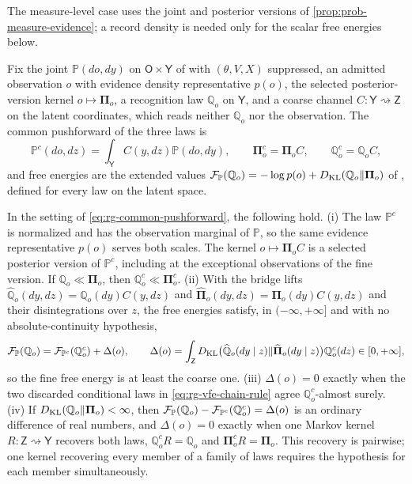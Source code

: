 The measure-level case uses the joint and posterior versions of
\cref{prop:prob-measure-evidence}; a record density is needed only for the
scalar free energies below.

Fix the joint $\mathbb P(do,dy)$ on $\mathsf O\times\mathsf Y$ of  with
$(\theta,V,X)$ suppressed, an admitted observation $o$ with evidence density representative $p(o)$,
the selected posterior-version kernel $o\mapsto\boldsymbol\Pi_o$, a recognition law $\mathbb Q_o$ on
$\mathsf Y$, and a coarse channel $C:\mathsf Y\rightsquigarrow\mathsf Z$ on the latent coordinates,
which reads neither $\mathbb Q_o$ nor the observation. The common pushforward of the three laws is
\begin{equation}
\mathbb P^c(do,dz)=\int_{\mathsf Y}C(y,dz)\mathbb P(do,dy),
\qquad
\boldsymbol\Pi^c_o=\boldsymbol\Pi_oC,
\qquad
\mathbb Q^c_o=\mathbb Q_oC,
\label{eq:rg-common-pushforward}
\end{equation}
and free energies are the extended values $\mathcal F_{\mathbb P}(\mathbb Q_o)=-\log p(o)
+D_{\mathrm{KL}}(\mathbb Q_o\Vert\boldsymbol\Pi_o)$ of , defined for every law on the
latent space.

\label{eq:rg-bridge-lifts}
In the setting of \eqref{eq:rg-common-pushforward}, the following hold. (i) The law $\mathbb P^c$
is normalized and has the observation marginal of $\mathbb P$, so the same evidence representative
$p(o)$ serves both scales. The kernel $o\mapsto\boldsymbol\Pi_oC$ is a selected posterior version of
$\mathbb P^c$, including at the exceptional observations of the fine version. If
$\mathbb Q_o\ll\boldsymbol\Pi_o$, then $\mathbb Q^c_o\ll\boldsymbol\Pi^c_o$. (ii) With the bridge
lifts $\widehat{\mathbb Q}_o(dy,dz)=\mathbb Q_o(dy)C(y,dz)$ and
$\widehat{\boldsymbol\Pi}_o(dy,dz)=\boldsymbol\Pi_o(dy)C(y,dz)$ and their disintegrations over $z$,
the free energies satisfy, in $(-\infty,+\infty]$ and with no absolute-continuity hypothesis,
\begin{equation}
\mathcal F_{\mathbb P}(\mathbb Q_o)
=\mathcal F_{\mathbb P^c}(\mathbb Q^c_o)+\Delta(o),
\qquad
\Delta(o)=\int_{\mathsf Z}
D_{\mathrm{KL}}\bigl(\widehat{\mathbb Q}_o(dy\mid z)\Vert\widehat{\boldsymbol\Pi}_o(dy\mid z)\bigr)
\mathbb Q^c_o(dz)\in[0,+\infty],
\label{eq:rg-vfe-chain-rule}
\end{equation}
so the fine free energy is at least the coarse one. (iii) $\Delta(o)=0$ exactly when the two
discarded conditional laws in \eqref{eq:rg-vfe-chain-rule} agree $\mathbb Q^c_o$-almost surely.
(iv) If $D_{\mathrm{KL}}(\mathbb Q_o\Vert\boldsymbol\Pi_o)<\infty$, then
$\mathcal F_{\mathbb P}(\mathbb Q_o)-\mathcal F_{\mathbb P^c}(\mathbb Q^c_o)=\Delta(o)$ is an
ordinary difference of real numbers, and $\Delta(o)=0$ exactly when one Markov kernel
$R:\mathsf Z\rightsquigarrow\mathsf Y$ recovers both laws, $\mathbb Q^c_oR=\mathbb Q_o$ and
$\boldsymbol\Pi^c_oR=\boldsymbol\Pi_o$. This recovery is pairwise; one kernel recovering every
member of a family of laws requires the hypothesis for each member simultaneously.

